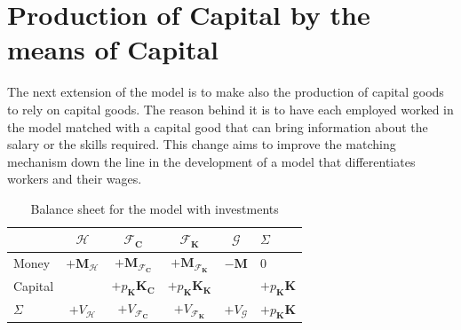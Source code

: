 \chapter{Production of Capital by the means of Capital}
The next extension of the model is to make also the production of capital goods to rely on capital goods.
The reason behind it is to have each employed worked in the model matched with a capital good that can bring information about the salary or the skills required. This change aims to improve the matching mechanism down the line in the development of a model that differentiates workers and their wages.

\begin{table}
    \centering
    \begin{tabular}{l|cccc|l}
                 & $\mathcal{H}$             & $\mathcal{F}_\mathbf{C}$               & $\mathcal{F}_\mathbf{K}$               & $\mathcal{G}$    & $\Sigma$                   \\
        \midrule
        Money    & $+\mathbf{M}_\mathcal{H}$ & $+\mathbf{M}_{\mathcal{F}_\mathbf{C}}$ & $+\mathbf{M}_{\mathcal{F}_\mathbf{K}}$ & $-\mathbf{M}$    & 0                          \\
        \midrule
        Capital  &                           & $+p_\mathbf{K} \mathbf{K}_\mathbf{C}$  & $+p_\mathbf{K} \mathbf{K}_\mathbf{K}$  &                  & $+p_\mathbf{K} \mathbf{K}$ \\
        \midrule
        $\Sigma$ & $+V_\mathcal{H}$          & $+V_{\mathcal{F}_\mathbf{C}}$          & $+V_{\mathcal{F}_\mathbf{K}}$          & $+V_\mathcal{G}$ & $+p_\mathbf{K} \mathbf{K}$ \\
    \end{tabular}
    \caption{Balance sheet for the model with investments}
\end{table}

